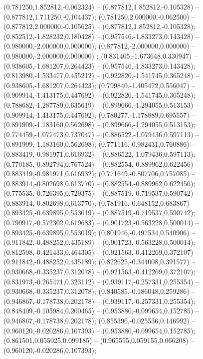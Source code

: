  (0.781250,1.852812,-0.062324) -- (0.877812,1.852812,-0.105328) -- (0.877812,1.711250,-0.104437);
 (0.781250,2.000000,-0.062500) -- (0.877812,2.000000,-0.105625) -- (0.877812,1.852812,-0.105328);
 (0.852512,-1.828232,0.180428) -- (0.957546,-1.833273,0.143428) -- (0.980000,-2.000000,0.000000);
 (0.877812,-2.000000,0.000000) -- (0.980000,-2.000000,0.000000) ;
 (0.831405,-1.673648,0.330947) -- (0.938605,-1.681207,0.264423) -- (0.957546,-1.833273,0.143428);
 (0.813980,-1.533477,0.455212) -- (0.922820,-1.541745,0.365248) -- (0.938605,-1.681207,0.264423);
 (0.799840,-1.405472,0.556047) -- (0.909914,-1.413175,0.447692) -- (0.922820,-1.541745,0.365248);
 (0.788682,-1.287789,0.635619) -- (0.899666,-1.294055,0.513153) -- (0.909914,-1.413175,0.447692);
 (0.780277,-1.178889,0.695557) -- (0.891909,-1.183160,0.562698) -- (0.899666,-1.294055,0.513153);
 (0.774459,-1.077473,0.737047) -- (0.886522,-1.079436,0.597113) -- (0.891909,-1.183160,0.562698);
 (0.771116,-0.982431,0.760886) -- (0.883419,-0.981971,0.616932) -- (0.886522,-1.079436,0.597113);
 (0.770185,-0.892794,0.767524) -- (0.882554,-0.889962,0.622456) -- (0.883419,-0.981971,0.616932);
 (0.771649,-0.807706,0.757085) -- (0.883914,-0.802698,0.613770) -- (0.882554,-0.889962,0.622456);
 (0.775535,-0.726395,0.729375) -- (0.887519,-0.719537,0.590742) -- (0.883914,-0.802698,0.613770);
 (0.781916,-0.648152,0.683867) -- (0.893425,-0.639895,0.553019) -- (0.887519,-0.719537,0.590742);
 (0.790917,-0.572302,0.619683) -- (0.901723,-0.563228,0.500014) -- (0.893425,-0.639895,0.553019);
 (0.801946,-0.497534,0.540906) -- (0.911842,-0.488252,0.435189) -- (0.901723,-0.563228,0.500014);
 (0.812598,-0.421433,0.464305) -- (0.921563,-0.412269,0.372107) -- (0.911842,-0.488252,0.435189);
 (0.822625,-0.344008,0.391577) -- (0.930668,-0.335237,0.312078) -- (0.921563,-0.412269,0.372107);
 (0.831973,-0.265471,0.323112) -- (0.939117,-0.257331,0.255354) -- (0.930668,-0.335237,0.312078);
 (0.840585,-0.186048,0.259286) -- (0.946867,-0.178738,0.202178) -- (0.939117,-0.257331,0.255354);
 (0.848409,-0.105984,0.200465) -- (0.953880,-0.099654,0.152785) -- (0.946867,-0.178738,0.202178);
 (0.855396,-0.025536,0.146992) -- (0.960120,-0.020286,0.107393) -- (0.953880,-0.099654,0.152785);
 (0.861501,0.055025,0.099185) -- (0.965555,0.059155,0.066208) -- (0.960120,-0.020286,0.107393);

